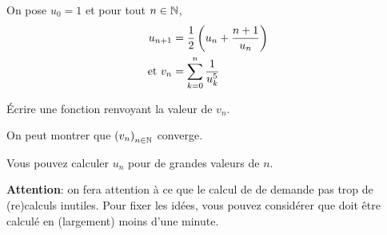  On pose $u_{0} = 1$ et pour tout $n\in \mathbb{N}$,
\begin{align*}
  u_{n+1} &= \frac{1}{2}\left( u_{n}+\frac{n+1}{u_{n}}\right)\\
\text{et } v_{n} &= \sum_{k=0}^{n} \frac{1}{u_{k}^{5}}
\end{align*}

\question{} Écrire une fonction  renvoyant la valeur de
  $v_{n}$.

On peut montrer que $\left( v_{n}\right)_{n\in \mathbb{N}}$ converge.

\question{} Vous pouvez calculer $u_{n}$ pour de grandes valeurs de $n$.

\textbf{Attention}: on fera attention à ce que le calcul de 
de demande  pas trop  de (re)calculs inutiles.  Pour fixer  les idées,
vous  pouvez considérer  que   doit  être calculé  en
(largement) moins d'une minute.